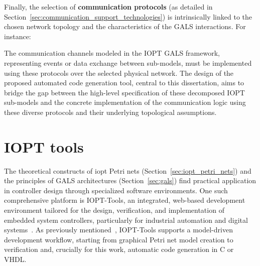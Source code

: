 Finally, the selection of \textbf{communication protocols} (as detailed in Section~\ref{sec:communication_support_technologies}) is intrinsically linked to the chosen network topology and the characteristics of the GALS interactions. For instance:
The communication channels modeled in the IOPT GALS framework, representing events or data exchange between sub-models, must be implemented using these protocols over the selected physical network. The design of the proposed automated code generation tool, central to this dissertation, aims to bridge the gap between the high-level specification of these decomposed IOPT sub-models and the concrete implementation of the communication logic using these diverse protocols and their underlying topological assumptions.








\section{IOPT tools}
\label{sec:iopt_tools}



The theoretical constructs of \gls{iopt} Petri nets (Section~\ref{sec:iopt_petri_nets}) and the principles of GALS architectures (Section~\ref{sec:gals}) find practical application in controller design through specialized software environments. One such comprehensive platform is IOPT-Tools, an integrated, web-based development environment tailored for the design, verification, and implementation of embedded system controllers, particularly for industrial automation and digital systems~\cite{iopttools}. As previously mentioned~\cite{iopttools}, IOPT-Tools supports a model-driven development workflow, starting from graphical Petri net model creation to verification and, crucially for this work, automatic code generation in C or VHDL.

